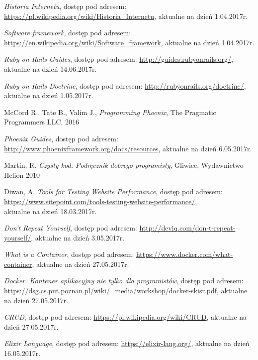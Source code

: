 \documentclass[mgr,oneside]{mgr}
\begin{document}
\begin{thebibliography}{inteligencja}

  \emph{Historia Internetu}, dostęp pod adresem: \url{https://pl.wikipedia.org/wiki/Historia_Internetu}, aktualne na dzień 1.04.2017r.

  \emph{Software framework}, dostęp pod adresem: \url{https://en.wikipedia.org/wiki/Software_framework}, aktualne na dzień 1.04.2017r.

	\emph{Ruby on Rails Guides}, dostęp pod adresem: \url{http://guides.rubyonrails.org/},\\ aktualne na dzień 14.06.2017r.

  \emph{Ruby on Rails Doctrine}, dostęp pod adresem: \url{http://rubyonrails.org/doctrine/}, aktualne na dzień 1.05.2017r.

  McCord R., Tate B., Valim J., \emph{Programming Phoenix}, The Pragmatic Programmers LLC, 2016

  \emph{Phoenix Guides}, dostęp pod adresem: \url{http://www.phoenixframework.org/docs/resources}, aktualne na dzień 6.05.2017r.

	Martin, R. \emph{Czysty kod. Podręcznik dobrego programisty}, Gliwice, Wydawnictwo Helion 2010

  Diwan, A. \emph{Tools for Testing Website Performance}, dostęp pod adresem: \url{https://www.sitepoint.com/tools-testing-website-performance/}, \\ aktualne na dzień 18.03.2017r.

  \emph{Don't Repeat Yourself}, dostęp pod adresem: \url{http://deviq.com/don-t-repeat-yourself/}, aktualne na dzień 3.05.2017r.

  \emph{What is a Container}, dostęp pod adresem: \url{https://www.docker.com/what-container}, aktualne na dzień 27.05.2017r.

  \emph{Docker. Kontener aplikacyjny nie tylko dla programistów}, dostęp pod adresem: \url{https://dsg.cs.put.poznan.pl/wiki/_media/workshop/docker-skisr.pdf}, aktualne na dzień 27.05.2017r.

  \emph{CRUD}, dostęp pod adresem: \url{https://pl.wikipedia.org/wiki/CRUD}, aktualne na dzień 27.05.2017r.

  \emph{Elixir Language}, dostęp pod adresem: \url{https://elixir-lang.org/}, aktualne na dzień 16.05.2017r.

\end{thebibliography}
\end{document}
